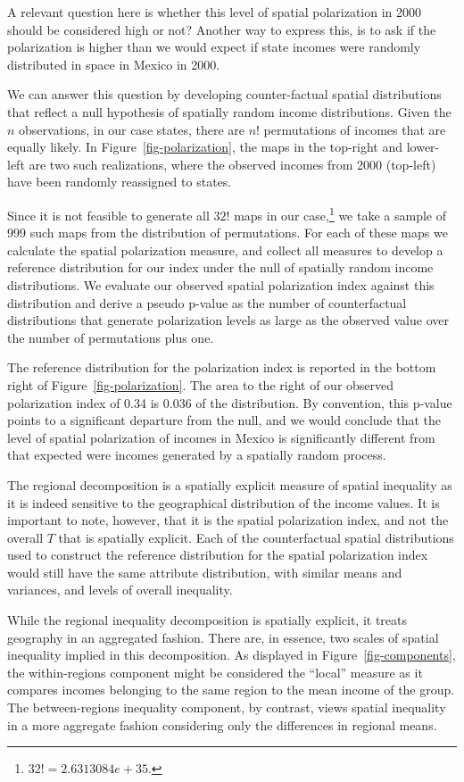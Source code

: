 \documentclass[
  a4paper, 
  twoside,
  final
]{article}
\begin{document}
A relevant question here is whether this level of spatial polarization
in 2000 should be considered high or not? Another way to express this,
is to ask if the polarization is higher than we would expect if state
incomes were randomly distributed in space in Mexico in 2000.

We can answer this question by developing counter-factual spatial
distributions that reflect a null hypothesis of spatially random income
distributions. Given the \(n\) observations, in our case states, there
are \(n!\) permutations of incomes that are equally likely. In
Figure~\ref{fig-polarization}, the maps in the top-right and lower-left
are two such realizations, where the observed incomes from 2000
(top-left) have been randomly reassigned to states.

Since it is not feasible to generate all \(32!\) maps in our
case,\footnote{\(32! = 2.6313084e+35\).} we take a sample of 999 such
maps from the distribution of permutations. For each of these maps we
calculate the spatial polarization measure, and collect all measures to
develop a reference distribution for our index under the null of
spatially random income distributions. We evaluate our observed spatial
polarization index against this distribution and derive a pseudo p-value
as the number of counterfactual distributions that generate polarization
levels as large as the observed value over the number of permutations
plus one.

The reference distribution for the polarization index is reported in the
bottom right of Figure~\ref{fig-polarization}. The area to the right of
our observed polarization index of 0.34 is 0.036 of the distribution. By
convention, this p-value points to a significant departure from the
null, and we would conclude that the level of spatial polarization of
incomes in Mexico is significantly different from that expected were
incomes generated by a spatially random process.

The regional decomposition is a spatially explicit measure of spatial
inequality as it is indeed sensitive to the geographical distribution of
the income values. It is important to note, however, that it is the
spatial polarization index, and not the overall \(T\) that is spatially
explicit. Each of the counterfactual spatial distributions used to
construct the reference distribution for the spatial polarization index
would still have the same attribute distribution, with similar means and
variances, and levels of overall inequality.

While the regional inequality decomposition is spatially explicit, it
treats geography in an aggregated fashion. There are, in essence, two
scales of spatial inequality implied in this decomposition. As displayed
in Figure~\ref{fig-components}, the within-regions component might be
considered the ``local'' measure as it compares incomes belonging to the
same region to the mean income of the group. The between-regions
inequality component, by contrast, views spatial inequality in a more
aggregate fashion considering only the differences in regional means.
\end{document}
